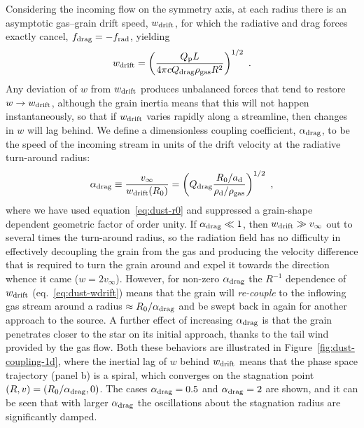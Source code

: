 Considering the incoming flow on the symmetry axis, at each radius
there is an asymptotic gas--grain drift speed, \(w_{\text{drift}}\), for which
the radiative and drag forces exactly cancel, \(f_{\text{drag}} = -f_{\text{rad}}\),
yielding
\begin{equation}
  \label{eq:dust-wdrift}
  w_{\text{drift}} = \left( \frac{Q_{\text{p}} L} {4\pi c Q_{\text{drag}} \rho_{\text{gas}} R^2} \right)^{1/2} \ .
\end{equation}
Any deviation of \(w\) from \(w_{\text{drift}}\) produces unbalanced forces
that tend to restore \(w \to w_{\text{drift}}\), although the grain inertia means
that this will not happen instantaneously, so that if \(w_{\text{drift}}\)
varies rapidly along a streamline, then changes in \(w\) will lag
behind.  We define a dimensionless coupling coefficient,
\(\alpha_{\text{drag}}\), to be the speed of the incoming stream in units of the
drift velocity at the radiative turn-around radius:
\begin{equation}
  \label{eq:dust-alpha}
  \alpha_{\text{drag}} \equiv \frac{v_\infty} {w_{\text{drift}}(R_0)} = \left(
    Q_{\text{drag}} \frac{R_0 / a_{\text{d}}} {\rho_{\text{d}} / \rho_{\text{gas}}}
  \right)^{1/2} \ ,
\end{equation}
where we have used equation~\eqref{eq:dust-r0} and suppressed a
grain-shape dependent geometric factor of order unity.  If
\(\alpha_{\text{drag}} \ll 1\), then \(w_{\text{drift}} \gg v_\infty\) out to several times the
turn-around radius, so the radiation field has no difficulty in
effectively decoupling the grain from the gas and producing the
velocity difference that is required to turn the grain around and
expel it towards the direction whence it came (\(w = 2 v_\infty\)).
However, for non-zero \(\alpha_{\text{drag}}\) the \(R^{-1}\) dependence of
\(w_{\text{drift}}\) (eq.~\eqref{eq:dust-wdrift}) means that the grain will
\textit{re-couple} to the inflowing gas stream around a radius
\(\approx R_0 / \alpha_{\text{drag}} \) and be swept back in again for another approach to
the source.  A further effect of increasing \(\alpha_{\text{drag}}\) is that the
grain penetrates closer to the star on its initial approach, thanks to
the tail wind provided by the gas flow.  Both these behaviors are
illustrated in Figure~\ref{fig:dust-coupling-1d}, where the inertial
lag of \(w\) behind \(w_{\text{drift}}\) means that the phase space trajectory
(panel b) is a spiral, which converges on the stagnation point
\((R, v) = (R_0 / \alpha_{\text{drag}}, 0)\). The cases \(\alpha_{\text{drag}} = 0.5\) and
\(\alpha_{\text{drag}} = 2\) are shown, and it can be seen that with larger
\(\alpha_{\text{drag}}\) the oscillations about the stagnation radius are
significantly damped.

